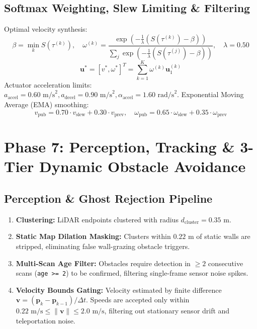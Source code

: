 \documentclass[10pt,a4paper]{article}
\begin{document}
\subsection{Softmax Weighting, Slew Limiting \& Filtering}
Optimal velocity synthesis:
\begin{equation}
\beta = \min_{k} S(\tau^{(k)}), \quad \omega^{(k)} = \frac{\exp\left(-\frac{1}{\lambda}(S(\tau^{(k)}) - \beta)\right)}{\sum_j \exp\left(-\frac{1}{\lambda}(S(\tau^{(j)}) - \beta)\right)}, \quad \lambda = 0.50
\end{equation}
\begin{equation}
\mathbf{u}^* = [v^*, \omega^*]^T = \sum_{k=1}^K \omega^{(k)} \mathbf{u}_1^{(k)}
\end{equation}
Actuator acceleration limits: $a_{\text{accel}} = 0.60\text{ m/s}^2, a_{\text{decel}} = 0.90\text{ m/s}^2, \alpha_{\text{accel}} = 1.60\text{ rad/s}^2$.
Exponential Moving Average (EMA) smoothing:
\begin{equation}
v_{\text{pub}} = 0.70 \cdot v_{\text{slew}} + 0.30 \cdot v_{\text{prev}}, \quad \omega_{\text{pub}} = 0.65 \cdot \omega_{\text{slew}} + 0.35 \cdot \omega_{\text{prev}}
\end{equation}

\section{Phase 7: Perception, Tracking \& 3-Tier Dynamic Obstacle Avoidance}

\subsection{Perception \& Ghost Rejection Pipeline}
\begin{enumerate}
    \item \textbf{Clustering:} LiDAR endpoints clustered with radius $d_{\text{cluster}} = 0.35\text{ m}$.
    \item \textbf{Static Map Dilation Masking:} Clusters within $0.22\text{ m}$ of static walls are stripped, eliminating false wall-grazing obstacle triggers.
    \item \textbf{Multi-Scan Age Filter:} Obstacles require detection in $\ge 2$ consecutive scans (\texttt{age >= 2}) to be confirmed, filtering single-frame sensor noise spikes.
    \item \textbf{Velocity Bounds Gating:} Velocity estimated by finite difference $\mathbf{v} = (\mathbf{p}_k - \mathbf{p}_{k-1})/\Delta t$. Speeds are accepted only within $0.22\text{ m/s} \le \|\mathbf{v}\| \le 2.0\text{ m/s}$, filtering out stationary sensor drift and teleportation noise.
\end{enumerate}
\end{document}
